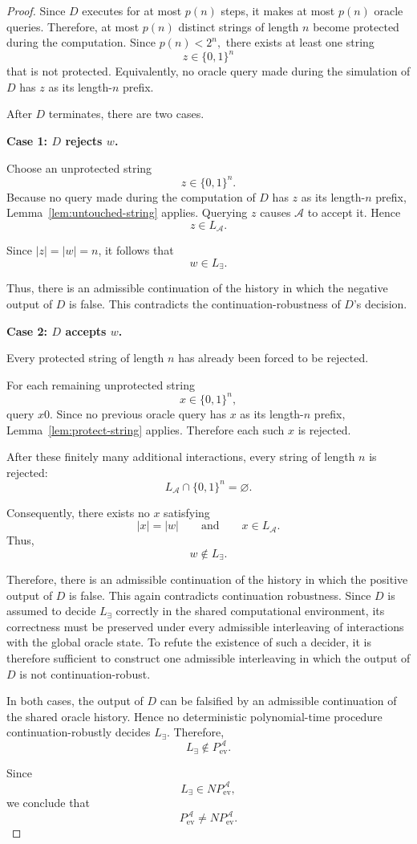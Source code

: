 \documentclass[11pt]{article}
\begin{document}
\begin{proof}
Since \(D\) executes for at most \(p(n)\) steps, it makes at most
\(p(n)\) oracle queries. Therefore, at most \(p(n)\) distinct strings
of length \(n\) become protected during the computation. Since
\(
p(n)<2^n,
\)
there exists at least one string
\[
z\in\{0,1\}^n
\]
that is not protected. Equivalently, no oracle query made during the
simulation of \(D\) has \(z\) as its length-\(n\) prefix.

After \(D\) terminates, there are two cases.

\medskip

\noindent
\textbf{Case 1: \(D\) rejects \(w\).}

Choose an unprotected string
\[
z\in\{0,1\}^n.
\]
Because no query made during the computation of \(D\) has \(z\) as
its length-\(n\) prefix, Lemma~\ref{lem:untouched-string} applies.
Querying \(z\) causes \(\mathcal A\) to accept it. Hence
\[
z\in L_{\mathcal A}.
\]

Since \(|z|=|w|=n\), it follows that
\[
w\in L_{\exists}.
\]

Thus, there is an admissible continuation of the history in which
the negative output of \(D\) is false. This contradicts the
continuation-robustness of \(D\)'s decision.

\medskip

\noindent
\textbf{Case 2: \(D\) accepts \(w\).}

Every protected string of length \(n\) has already been forced to be
rejected.

For each remaining unprotected string
\[
x\in\{0,1\}^n,
\]
query \(x0\). Since no previous oracle query has \(x\) as its
length-\(n\) prefix, Lemma~\ref{lem:protect-string} applies. Therefore
each such \(x\) is rejected.

After these finitely many additional interactions, every string of
length \(n\) is rejected:
\[
L_{\mathcal A}\cap\{0,1\}^n
=
\varnothing.
\]

Consequently, there exists no \(x\) satisfying
\[
|x|=|w|
\qquad\text{and}\qquad
x\in L_{\mathcal A}.
\]
Thus,
\[
w\notin L_{\exists}.
\]

Therefore, there is an admissible continuation of the history in which the positive output of \(D\) is false. This again contradicts continuation robustness.
Since \(D\) is assumed to decide \(L_{\exists}\) correctly in the shared computational environment, its correctness must be preserved under every admissible interleaving of interactions with the global oracle state. To refute the existence of such a decider, it is therefore sufficient to construct one admissible interleaving in which the output of \(D\) is not continuation-robust.



\medskip

In both cases, the output of \(D\) can be falsified by an admissible
continuation of the shared oracle history. Hence no deterministic
polynomial-time procedure continuation-robustly decides
\(L_{\exists}\). Therefore,
\[
L_{\exists}\notin P_{\mathrm{ev}}^{\mathcal A}.
\]

Since
\[
L_{\exists}\in NP_{\mathrm{ev}}^{\mathcal A},
\]
we conclude that
\[
P_{\mathrm{ev}}^{\mathcal A}
\neq
NP_{\mathrm{ev}}^{\mathcal A}.
\]
\end{proof}
\end{document}
